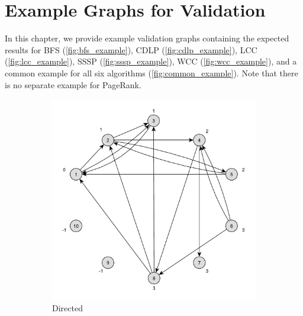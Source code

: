 \chapter{Example Graphs for Validation}
\label{chap:validation_examples}

In this chapter, we provide example validation graphs containing the expected results for
BFS (\autoref{fig:bfs_example}),
CDLP (\autoref{fig:cdlp_example}),
LCC (\autoref{fig:lcc_example}),
SSSP (\autoref{fig:sssp_example}),
WCC (\autoref{fig:wcc_example}),
and a common example for all six algorithms (\autoref{fig:common_example}). Note that there is no separate example for PageRank.

\newcommand{\examplescale}{0.48}

\begin{figure}[h]
	\centering
	\begin{subfigure}{0.496\textwidth}
		\centering
		\includegraphics[scale=\examplescale]{figures/examples/bfs-dir.pdf}
		\caption{Directed}
	\end{subfigure}
	\begin{subfigure}{0.496\textwidth}
		\centering

\end{subfigure}
\end{figure}
